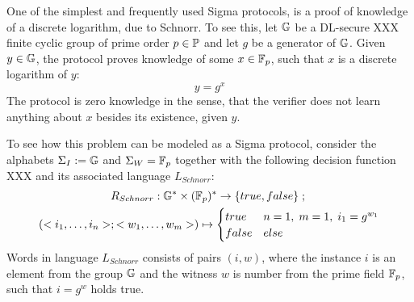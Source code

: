 \begin{example}
One of the simplest and frequently used Sigma protocols, is a proof of knowledge of a discrete logarithm,  due to Schnorr. To see this, let $\mathbb{G}$ be a DL-secure XXX finite cyclic group of prime order $p\in\mathbb{P}$ and let $g$ be a generator of $\mathbb{G}$. Given $y\in \mathbb{G}$, the protocol proves knowledge of some $x \in \mathbb{F}_p$, such that $x$ is a discrete logarithm of $y$:
$$
y = g^x
$$
The protocol is zero knowledge in the sense, that the verifier does not learn anything about $x$ besides its existence, given $y$.

To see how this problem can be modeled as a Sigma protocol, consider the alphabets $\Sigma_I:=\mathbb{G}$ and $\Sigma_W= \mathbb{F}_p$ together with the following decision function XXX and its associated language $L_{Schnorr}$:
\begin{multline*}
R_{Schnorr} : \mathbb{G}^* \times (\mathbb{F}_p)^* \to \{true, false\}\;;\;\\
(<i_1,\ldots,i_n>;<w_1,\ldots, w_m>) \mapsto
\begin{cases}
true & n=1,\; m=1,\; i_1 = g^{w_1}\\
false & else
\end{cases}
\end{multline*}
Words in language $L_{Schnorr}$ consists of pairs $(i,w)$, where the instance $i$ is an element from the group $\mathbb{G}$ and the witness $w$ is number from the prime field $\mathbb{F}_p$, such that $i=g^w$ holds true.


\end{example}
